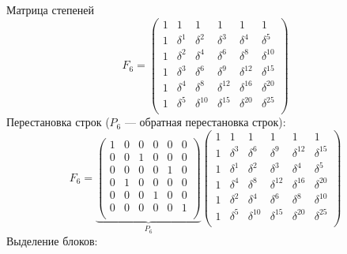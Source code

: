 Матрица степеней
\[
    F_6
    = \begin{pmatrix}
        1 & 1        & 1           & 1           & 1           & 1           \\
        1 & \delta^1 & \delta^2    & \delta^3    & \delta^4    & \delta^5    \\
        1 & \delta^2 & \delta^4    & \delta^6    & \delta^8    & \delta^{10} \\
        1 & \delta^3 & \delta^6    & \delta^9    & \delta^{12} & \delta^{15} \\
        1 & \delta^4 & \delta^8    & \delta^{12} & \delta^{16} & \delta^{20} \\
        1 & \delta^5 & \delta^{10} & \delta^{15} & \delta^{20} & \delta^{25} \\
    \end{pmatrix}
\]
Перестановка строк ($P_6$ --- обратная перестановка строк):
\[
    F_6
    =
    \underbrace{
        \begin{pmatrix}
            1 & 0 & 0 & 0 & 0 & 0 \\
            0 & 0 & 1 & 0 & 0 & 0 \\
            0 & 0 & 0 & 0 & 1 & 0 \\
            0 & 1 & 0 & 0 & 0 & 0 \\
            0 & 0 & 0 & 1 & 0 & 0 \\
            0 & 0 & 0 & 0 & 0 & 1 \\
        \end{pmatrix}
    }_{P_6}
    \begin{pmatrix}
        1 & 1        & 1           & 1           & 1           & 1           \\
        1 & \delta^3 & \delta^6    & \delta^9    & \delta^{12} & \delta^{15} \\
        1 & \delta^1 & \delta^2    & \delta^3    & \delta^4    & \delta^5    \\
        1 & \delta^4 & \delta^8    & \delta^{12} & \delta^{16} & \delta^{20} \\
        1 & \delta^2 & \delta^4    & \delta^6    & \delta^8    & \delta^{10} \\
        1 & \delta^5 & \delta^{10} & \delta^{15} & \delta^{20} & \delta^{25} \\
    \end{pmatrix}
\]
Выделение блоков:
